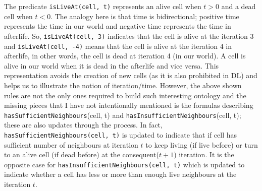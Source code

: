 \documentclass[a4paper]{article}
\begin{document}
The predicate \lstinline{isLiveAt(cell, t)} represents an alive cell when $t>0$ and a dead cell when $t<0$. The analogy here is that time is bidirectional; positive time represents the time in our world 
and negative time represents the time in afterlife. So, \lstinline{isLiveAt(cell, 3)} indicates that the cell is alive at the iteration 3 and \lstinline{isLiveAt(cell, -4)} means that the cell is alive 
at the iteration 4 in afterlife, in other words, the cell is dead at iteration 4 (in our world). A cell is alive in our world when it is dead in the afterlife and vice versa. This representation avoids 
the creation of new cells (as it is also prohibited in DL) and helps us to illustrate the notion of iteration/time. However, the above shown rules are not the only ones required to build such interesting 
ontology and the missing pieces that I have not intentionally mentioned is the formulas describing \lstinline{hasSufficientNeighbours}(cell, t) and \lstinline{hasInsufficientNeighbours}(cell, t); these 
are also updates through the process. In fact, \lstinline{hasSufficientNeighbours(cell, t)} is updated to indicate that if cell has sufficient number of neighbours at iteration $t$ to keep living 
(if live before) or turn to an alive cell (if dead before) at the consequent($t+1$) iteration. It is the opposite case for \lstinline{hasInsufficientNeighbours(cell, t)} which is updated to indicate 
whether a cell has less or more than enough live neighbours at the iteration $t$.
\end{document}

